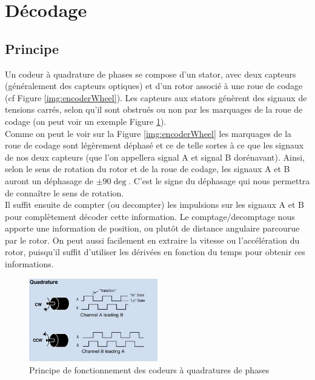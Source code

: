 \section{Décodage}
	\subsection{Principe}
	Un codeur à quadrature de phases se compose d'un stator, avec deux capteurs (généralement des capteurs optiques) et d'un rotor associé à une roue de codage (cf Figure \ref{img:encoderWheel}). Les capteurs aux stators génèrent des signaux de tensions carrés, selon qu'il sont obstrués ou non par les marquages de la roue de codage (on peut voir un exemple Figure \ref{img:schemaQuadrature}).\\
	
	Comme on peut le voir sur la Figure \ref{img:encoderWheel} les marquages de la roue de codage sont légèrement déphasé et ce de telle sortes à ce que les signaux de nos deux capteurs (que l'on appellera signal A et signal B dorénavant). Ainsi, selon le sens de rotation du rotor et de la roue de codage, les signaux A et B auront un déphasage de $\pm 90\deg$. C'est le signe du déphasage qui nous permettra de connaître le sens de rotation.\\
	Il suffit ensuite de compter (ou decompter) les impulsions sur les signaux A et B pour complètement décoder cette information. Le comptage/decomptage nous apporte une information de position, ou plutôt de distance angulaire parcourue par le rotor. On peut aussi facilement en extraire la vitesse ou l'accélération  du rotor, puisqu'il suffit d'utiliser les dérivées en fonction du temps pour obtenir ces informations.\\

	\begin{figure}[h!]
  		\centering
  		\includegraphics[width=0.5\textwidth]{img/quadrature}
 		\caption{Principe de fonctionnement des codeurs à quadratures de phases}
  		\label{img:schemaQuadrature}
	\end{figure}	

